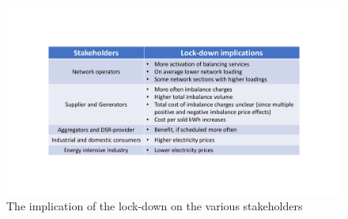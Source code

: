 \documentclass[energies,article,submit,moreauthors,pdftex]{Definitions/mdpi}
\begin{document}
\begin{figure}[H]
\centering
\hspace{-25pt}
\includegraphics[trim={2cm 3cm 2cm 3.5cm},clip,width=1\textwidth]{Graphics/Stakeholder - lock-down implications.pdf}
\caption{The implication of the lock-down on the various stakeholders}
\label{fig:imbalance-price-trade-off}
\end{figure} 
\end{document}
